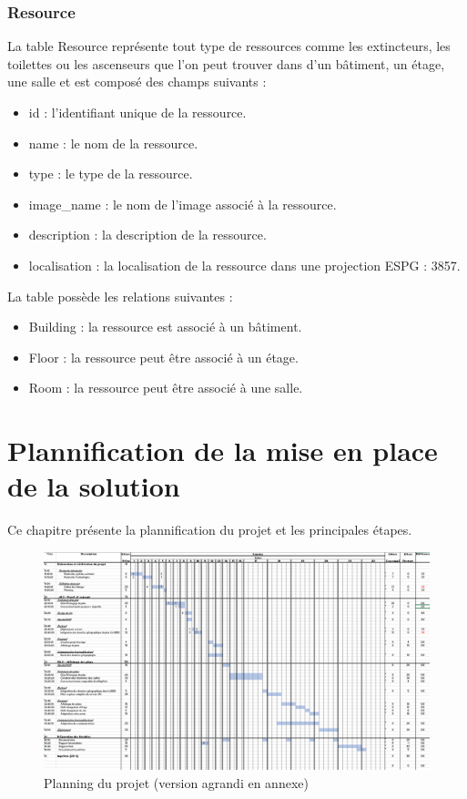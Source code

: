 \documentclass[
    iai, %
    il, %
]{heig-tb}
\begin{document}
\subsubsection{Resource}
La table Resource représente tout type de ressources comme les extincteurs, les toilettes ou les ascenseurs
que l'on peut trouver dans d'un bâtiment, un étage, une salle et est composé des champs suivants :

\begin{itemize}
    \item id : l'identifiant unique de la ressource.
    \item name : le nom de la ressource.
    \item type : le type de la ressource.
    \item image\_name : le nom de l'image associé à la ressource.
    \item description : la description de la ressource.
    \item localisation : la localisation de la ressource dans une projection ESPG : 3857.
\end{itemize}

La table possède les relations suivantes :
\begin{itemize}
    \item Building : la ressource est associé à un bâtiment.
    \item Floor : la ressource peut être associé à un étage.
    \item Room : la ressource peut être associé à une salle.
\end{itemize}

\section{Plannification de la mise en place de la solution}
Ce chapitre présente la plannification du projet et les principales étapes.

\begin{figure}[H]
    \caption{Planning du projet (version agrandi en annexe)}
    \centering
    \includegraphics[scale=0.5]{planning.png}
\end{figure}
\end{document}
